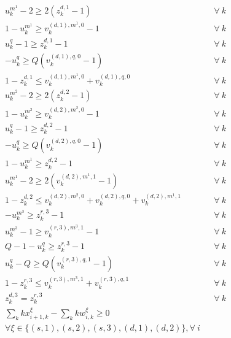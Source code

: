 \documentclass[]{interact}
\theoremstyle{plain}%
\theoremstyle{definition}
\theoremstyle{remark}
\begin{document}
\begin{eqnarray}
u^{m^1}_k - 2 \ge 2(z^{d,1}_{k}-1)&& \forall\ k\label{merge:d1.1}\\
1 - u^{m^1}_k \ge v^{(d,1),m^1,0}_k-1 && \forall\ k \label{merge:d1.2}\\
u^{q}_k - 1 \ge z^{d,1}_{k}-1 && \forall\ k\label{merge:d1.3}\\
- u^q_k \ge Q(v^{(d,1),q,0}_k-1) && \forall\ k \label{merge:d1.4}\\
1 - z^{d,1}_{k} \le v^{(d,1),m^1,0}_k + v^{(d,1),q,0}_k&&\forall\ k\label{merge:d1.5}\\
u^{m^2}_k - 2 \ge 2(z^{d,2}_{k}-1)&& \forall\ k\label{merge:d2.1}\\
1 - u^{m^2}_k \ge v^{(d,2),m^2,0}_k-1 && \forall\ k \label{merge:d2.2}\\
u^{q}_k - 1 \ge z^{d,2}_{k}-1 && \forall\ k\label{merge:d2.3}\\
- u^q_k \ge Q(v^{(d,2),q,0}_k-1) && \forall\ k \label{merge:d2.4}\\
1 - u^{m^1}_k \ge z^{d,2}_{k}-1&& \forall\ k\label{merge:d2.5}\\
u^{m^1}_k -  2 \ge 2(v^{(d,2),m^1,1}_k-1) && \forall\ k \label{merge:d2.6}\\
1 - z^{d,2}_{k} \le v^{(d,2),m^2,0}_k + v^{(d,2),q,0}_k + v^{(d,2),m^1,1}_k&&\forall\ k\label{merge:d2.7}\\
- u^{m^3}_k \ge z^{r,3}_{k}-1&& \forall\ k\label{merge:s3.1}\\
u^{m^3}_k - 1 \ge v^{(r,3),m^3,1}_k-1 && \forall\ k \label{merge:s3.2}\\
Q-1 - u^q_k \ge z^{r,3}_{k}-1&& \forall\ k\label{merge:s3.3}\\
u^q_k - Q \ge Q(v^{(r,3),q,1}_k-1) && \forall\ k\label{merge:s3.4}\\
1 - z^{r,3}_{k} \le v^{(r,3),m^3,1}_k + v^{(r,3),q,1}_k&&\forall\ k\label{merge:s3.5}\\
z^{d,3}_{k} = z^{r,3}_{k}&&\forall\ k\label{merge:d3.1}\\
\sum_{k} kx^{\xi}_{i+1,k} - \sum_{k} kw^{\xi}_{i,k} \ge 0\nonumber\\
\forall \xi\in\{(s,1),(s,2),(s,3),(d,1),(d,2)\}, \forall\ i\label{merge:C11}\\

\end{eqnarray}
\end{document}
